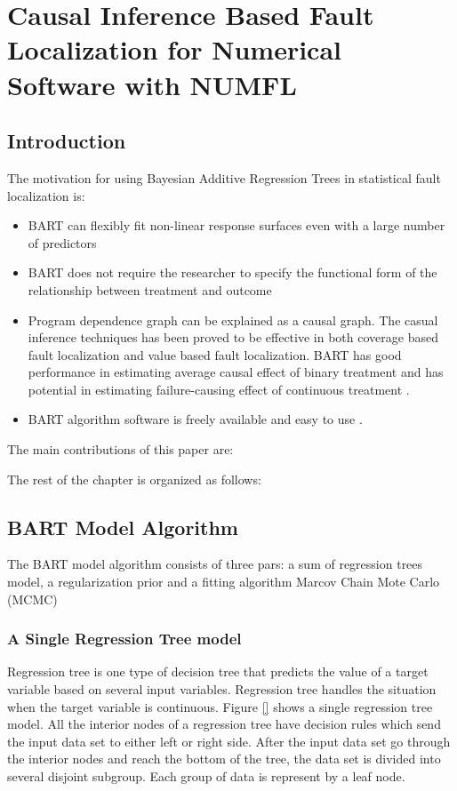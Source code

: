 \chapter{Causal Inference Based Fault Localization for Numerical Software with NUMFL}\label{chap:NUMFL}


\section{Introduction}\label{BARTintro}
\vspace{-2pt}

The motivation for using Bayesian Additive Regression Trees in statistical fault localization is:
\vspace{-0.2cm}
\begin{itemize}
\item BART can flexibly fit non-linear response surfaces even with a large number of predictors
\item BART does not require the researcher to specify the functional form of the relationship between treatment and outcome
\item Program dependence graph can be explained as a causal graph. The casual inference techniques has been proved to be effective in both coverage based fault localization and value based fault localization. BART has good performance in estimating average causal effect of binary treatment and has potential in estimating failure-causing effect of continuous treatment \cite{}.
\item BART algorithm software is freely available and easy to use \cite{}.
\end{itemize}

The main contributions of this paper are:

The rest of the chapter is organized as follows: 

\section{BART Model Algorithm}\label{BARTbg}%
The BART model algorithm consists of three pars: a sum of regression trees model, a regularization prior and a fitting algorithm Marcov Chain Mote Carlo (MCMC) 
\subsection{A Single Regression Tree model}\label{IIIA}
Regression tree is one type of decision tree that predicts the value of a target variable based on several input variables. Regression tree handles the situation when the target variable is continuous. Figure \ref{} shows a single regression tree model. All the interior nodes of a regression tree have decision rules which send the input data set to either left or right side. After the input data set go through the interior nodes and reach the bottom of the tree, the data set is divided into several disjoint subgroup. Each group of data is represent by a leaf node. 

